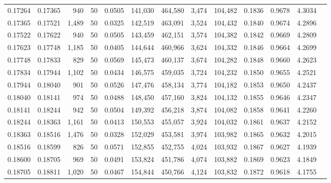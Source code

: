 \begin{tabular}{rrrrrrrrrrrrr}
0.17264 & 0.17365 &   940 &  50 &                                     0.0505 & 141,030 & 464,580 &   3,474 & 104,482 & 0.1836 & 0.9678 & 4.3034 \\
0.17365 & 0.17521 & 1,489 &  50 &                                     0.0325 & 142,519 & 463,091 &   3,524 & 104,432 & 0.1840 & 0.9674 & 4.2896 \\
0.17522 & 0.17622 &   940 &  50 &                                     0.0505 & 143,459 & 462,151 &   3,574 & 104,382 & 0.1842 & 0.9669 & 4.2809 \\
0.17623 & 0.17748 & 1,185 &  50 &                                     0.0405 & 144,644 & 460,966 &   3,624 & 104,332 & 0.1846 & 0.9664 & 4.2699 \\
0.17748 & 0.17833 &   829 &  50 &                                     0.0569 & 145,473 & 460,137 &   3,674 & 104,282 & 0.1848 & 0.9660 & 4.2623 \\
0.17834 & 0.17944 & 1,102 &  50 &                                     0.0434 & 146,575 & 459,035 &   3,724 & 104,232 & 0.1850 & 0.9655 & 4.2521 \\
0.17944 & 0.18040 &   901 &  50 &                                     0.0526 & 147,476 & 458,134 &   3,774 & 104,182 & 0.1853 & 0.9650 & 4.2437 \\
0.18040 & 0.18141 &   974 &  50 &                                     0.0488 & 148,450 & 457,160 &   3,824 & 104,132 & 0.1855 & 0.9646 & 4.2347 \\
0.18141 & 0.18244 &   942 &  50 &                                     0.0504 & 149,392 & 456,218 &   3,874 & 104,082 & 0.1858 & 0.9641 & 4.2260 \\
0.18244 & 0.18363 & 1,161 &  50 &                                     0.0413 & 150,553 & 455,057 &   3,924 & 104,032 & 0.1861 & 0.9637 & 4.2152 \\
0.18363 & 0.18516 & 1,476 &  50 &                                     0.0328 & 152,029 & 453,581 &   3,974 & 103,982 & 0.1865 & 0.9632 & 4.2015 \\
0.18516 & 0.18599 &   826 &  50 &                                     0.0571 & 152,855 & 452,755 &   4,024 & 103,932 & 0.1867 & 0.9627 & 4.1939 \\
0.18600 & 0.18705 &   969 &  50 &                                     0.0491 & 153,824 & 451,786 &   4,074 & 103,882 & 0.1869 & 0.9623 & 4.1849 \\
0.18705 & 0.18811 & 1,020 &  50 &                                     0.0467 & 154,844 & 450,766 &   4,124 & 103,832 & 0.1872 & 0.9618 & 4.1755 \\

\end{tabular}
